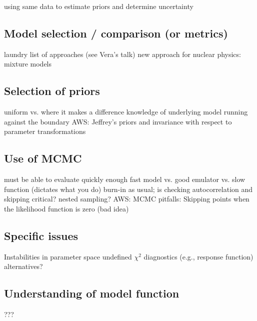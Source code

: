   \bi
    \I using same data to estimate priors and determine uncertainty
  \ei


\subsection{Model selection / comparison (or metrics)}  \label{subsec:model_comparison}

  \bi
    \I laundry list of approaches (see Vera's talk)
    \I new approach for nuclear physics: mixture models
  \ei


\subsection{Selection of priors}  \label{subsec:selecting_priors}

  \bi
    \I uniform vs. where it makes a difference
    \I knowledge of underlying model 
    \I running against the boundary
    \I AWS: Jeffrey's priors and invariance with respect to
    parameter transformations
  \ei


\subsection{Use of MCMC}  \label{subsec:using_mcmc}

  \bi
    \I must be able to evaluate quickly enough
    \I fast model vs. good emulator vs. slow function (dictates what you do)
    \I burn-in as usual; is checking autocorrelation and skipping critical?
    \I nested sampling?
    \I AWS: MCMC pitfalls: Skipping points when the likelihood
    function is zero (bad idea)
  \ei


\subsection{Specific issues}  \label{subsec:issues}

  \bi
    \I Instabilities in parameter space
      \bi
        \I undefined $\chi^2$
        \I diagnostics (e.g., response function) 
        \I alternatives?
      \ei     
  \ei


\subsection{Understanding of model function}  \label{subsec:model_function}

  \bi
    \I ???
  \ei



